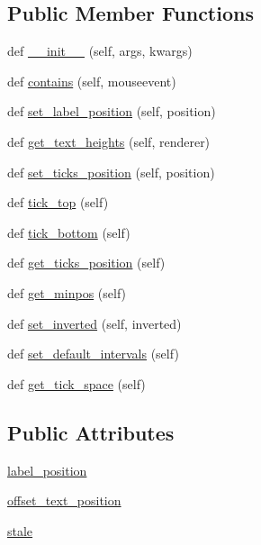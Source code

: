 \subsection*{Public Member Functions}
\begin{DoxyCompactItemize}
\item 
def \hyperlink{classmatplotlib_1_1axis_1_1XAxis_aaad31e0f415f4761ca51091bd29313c4}{\+\_\+\+\_\+init\+\_\+\+\_\+} (self, args, kwargs)
\item 
def \hyperlink{classmatplotlib_1_1axis_1_1XAxis_aa88a54dbdd47befca66e935cd49d0918}{contains} (self, mouseevent)
\item 
def \hyperlink{classmatplotlib_1_1axis_1_1XAxis_ab6c894b18a13f608788cb909424fb61a}{set\+\_\+label\+\_\+position} (self, position)
\item 
def \hyperlink{classmatplotlib_1_1axis_1_1XAxis_a056a737a98ee692c207d0089b314f6a8}{get\+\_\+text\+\_\+heights} (self, renderer)
\item 
def \hyperlink{classmatplotlib_1_1axis_1_1XAxis_ac33c0698c69145e1e576a599e20ac48e}{set\+\_\+ticks\+\_\+position} (self, position)
\item 
def \hyperlink{classmatplotlib_1_1axis_1_1XAxis_a84db896e21eeb2910261e42a13a55d84}{tick\+\_\+top} (self)
\item 
def \hyperlink{classmatplotlib_1_1axis_1_1XAxis_a2ab8ec8b335f2308bad82c67e6e3ff8b}{tick\+\_\+bottom} (self)
\item 
def \hyperlink{classmatplotlib_1_1axis_1_1XAxis_af84ec2de6ad935cd33ba19feb79261ef}{get\+\_\+ticks\+\_\+position} (self)
\item 
def \hyperlink{classmatplotlib_1_1axis_1_1XAxis_a1dac043ad555b127d0f2cd5b4625204b}{get\+\_\+minpos} (self)
\item 
def \hyperlink{classmatplotlib_1_1axis_1_1XAxis_a6879b7760c570a41059fb5f1adef4a88}{set\+\_\+inverted} (self, inverted)
\item 
def \hyperlink{classmatplotlib_1_1axis_1_1XAxis_a6f87b3e2c01ef64ba898d3940bc7a29d}{set\+\_\+default\+\_\+intervals} (self)
\item 
def \hyperlink{classmatplotlib_1_1axis_1_1XAxis_a34cc7f0e350ec06f2318c8d3f18e6f51}{get\+\_\+tick\+\_\+space} (self)
\end{DoxyCompactItemize}
\subsection*{Public Attributes}
\begin{DoxyCompactItemize}
\item 
\hyperlink{classmatplotlib_1_1axis_1_1XAxis_a27218ace3d5e271ab87af492a7a9e9ec}{label\+\_\+position}
\item 
\hyperlink{classmatplotlib_1_1axis_1_1XAxis_ab72769e8828708e8f9f9e54bfd543f05}{offset\+\_\+text\+\_\+position}
\item 
\hyperlink{classmatplotlib_1_1axis_1_1XAxis_a6c5bb1b945f329b2125fb282d20475db}{stale}
\end{DoxyCompactItemize}
